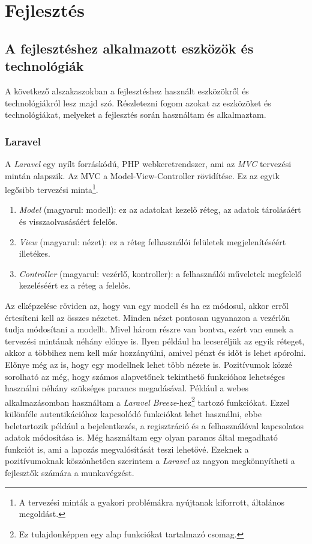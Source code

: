 \documentclass[]{thesis-ekf}
\theoremstyle{definition}
\theoremstyle{remark}
\begin{document}
	\chapter{Fejlesztés}\label{ch-fejlesztes}		
	\section{A fejlesztéshez alkalmazott eszközök és technológiák}
		A következő alszakaszokban a fejlesztéshez használt eszközökről és technológiákról lesz majd szó. Részletezni fogom azokat az eszközöket és technológiákat, melyeket a fejlesztés során használtam és alkalmaztam.
	\subsection{Laravel}\label{sc-laravel}
		A \emph{Laravel} egy nyílt forráskódú, PHP webkeretrendszer, ami az \emph{MVC} tervezési mintán alapszik. Az MVC a Model-View-Controller rövidítése. Ez az egyik legősibb tervezési minta\footnote{A tervezési minták a gyakori problémákra nyújtanak kiforrott, általános megoldást.}.
		\begin{enumerate}
			\item \emph{Model} (magyarul: modell): ez az adatokat kezelő réteg, az adatok tárolásáért és visszaolvasásáért felelős.
			\item \emph{View} (magyarul: nézet): ez a réteg felhasználói felületek megjelenítéséért illetékes. 
			\item \emph{Controller} (magyarul: vezérlő, kontroller): a felhasználói műveletek megfelelő kezeléséért ez a réteg a felelős.
		\end{enumerate}
		Az elképzelése röviden az, hogy van egy modell és ha ez módosul, akkor erről értesíteni kell az összes nézetet. Minden nézet pontosan ugyanazon a vezérlőn tudja módosítani a modellt. Mivel három részre van bontva, ezért van ennek a tervezési mintának néhány előnye is. Ilyen például ha lecseréljük az egyik réteget, akkor a többihez nem kell már hozzányúlni, amivel pénzt és időt is lehet spórolni. Előnye még az is, hogy egy modellnek lehet több nézete is. Pozitívumok közzé sorolható az még, hogy számos alapvetőnek tekinthető funkcióhoz lehetséges használni néhány szükséges parancs megadásával. Például a webes alkalmazásomban használtam a \emph{Laravel Breeze}-hez\footnote{Ez tulajdonképpen egy alap funkciókat tartalmazó csomag.} tartozó funkciókat. Ezzel különféle autentikációhoz kapcsolódó funkciókat lehet használni, ebbe beletartozik például a bejelentkezés, a regisztráció és a felhasználóval kapcsolatos adatok módosítása is. Még használtam egy olyan parancs által megadható funkciót is, ami a lapozás megvalósítását teszi lehetővé. Ezeknek a pozitívumoknak köszönhetően szerintem a \emph{Laravel} az nagyon megkönnyítheti a fejlesztők számára a munkavégzést. 
		\cite{Laravel, Kusper}
\end{document}
